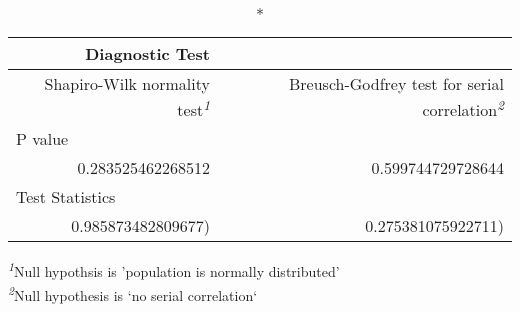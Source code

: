 \setlength{\LTpost}{0mm}
\begin{longtable}{rr}
\caption*{
{\large Diagnostic Test}
} \\ 
\toprule
Shapiro-Wilk normality test\textsuperscript{\textit{1}} & Breusch-Godfrey test for serial correlation\textsuperscript{\textit{2}} \\ 
\midrule
\multicolumn{2}{l}{P value} \\ 
\midrule
0.283525462268512 & 0.599744729728644 \\ 
\midrule
\multicolumn{2}{l}{Test Statistics} \\ 
0.985873482809677) & 0.275381075922711) \\ 
\bottomrule
\end{longtable}
\begin{minipage}{\linewidth}
\textsuperscript{\textit{1}}Null hypothsis is 'population is normally distributed'\\
\textsuperscript{\textit{2}}Null hypothesis is `no serial correlation`\\
\end{minipage}

